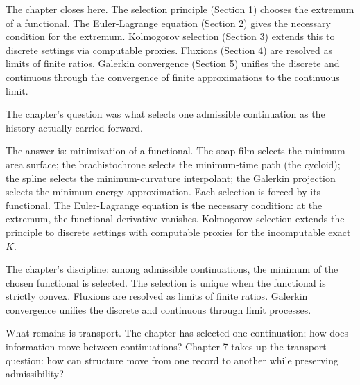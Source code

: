 The chapter closes here. The selection principle (Section 1) chooses
the extremum of a functional. The Euler-Lagrange equation (Section
2) gives the necessary condition for the extremum. Kolmogorov
selection (Section 3) extends this to discrete settings via
computable proxies. Fluxions (Section 4) are resolved as limits of
finite ratios. Galerkin convergence (Section 5) unifies the
discrete and continuous through the convergence of finite
approximations to the continuous limit.

\begin{bridge}

The chapter's question was what selects one admissible continuation
as the history actually carried forward.

The answer is: minimization of a functional. The soap film selects
the minimum-area surface; the brachistochrone selects the
minimum-time path (the cycloid); the spline selects the
minimum-curvature interpolant; the Galerkin projection selects the
minimum-energy approximation. Each selection is forced by its
functional. The Euler-Lagrange equation is the necessary
condition: at the extremum, the functional derivative vanishes.
Kolmogorov selection extends the principle to discrete settings
with computable proxies for the incomputable exact $K$.

The chapter's discipline: among admissible continuations, the
minimum of the chosen functional is selected. The selection is
unique when the functional is strictly convex. Fluxions are
resolved as limits of finite ratios. Galerkin convergence unifies
the discrete and continuous through limit processes.

What remains is transport. The chapter has selected one
continuation; how does information move between continuations?
Chapter 7 takes up the transport question: how can structure
move from one record to another while preserving admissibility?

\end{bridge}

